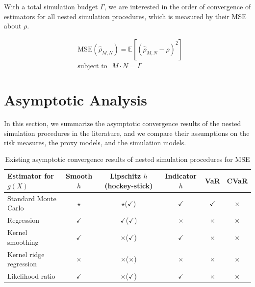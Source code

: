 \documentclass{article}
\begin{document}
With a total simulation budget $\Gamma$, we are interested in the order of convergence of estimators for all nested simulation procedures, which is measured by their MSE about $\rho$.

\begin{align}
    & \text{MSE}(\hat{\rho}_{M, N}) = \mathbb{E} \left[ \left( \hat{\rho}_{M, N} - \rho \right)^2 \right] \nonumber \\
    & \text{subject to} ~~~ M \cdot N = \Gamma
\end{align}

\section{Asymptotic Analysis} \label{sec:asymptotic-convergence}
In this section, we summarize the asymptotic convergence results of the nested simulation procedures in the literature, and we compare their assumptions on the risk measures, the proxy models, and the simulation models.

\begin{table}[ht]
    \centering
    \begin{tabular}{|l|c|c|c|c|c|}
    \hline
    Estimator for $g(X)$ & Smooth $h$ & Lipschitz $h$ (hockey-stick) & Indicator $h$ & VaR & CVaR \\
    \hline
    Standard Monte Carlo
    \footnotemark[1] & $\star$ & $\star$($\checkmark$) & $\checkmark$ & $\checkmark$ & $\times$ \\
    \hline
    Regression & $\checkmark$ & $\checkmark$($\checkmark$) & $\times$ & $\times$ & $\times$ \\
    \hline
    Kernel smoothing & $\checkmark$ & $\times$($\checkmark$) & $\checkmark$ & $\times$ & $\times$ \\
    \hline
    Kernel ridge regression & $\times$ & $\times$($\times$) & $\times$ & $\times$ & $\times$ \\
    \hline
    Likelihood ratio & $\checkmark$ & $\times$($\checkmark$) & $\checkmark$ & $\times$ & $\times$ \\
    \hline
    \end{tabular}
    \caption{Existing asymptotic convergence results of nested simulation procedures for MSE}
    \label{tab:asymConv-mse}
\end{table}

\end{document}
